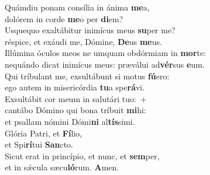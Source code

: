 \evenverse Quámdiu ponam consília in ánima \textbf{me}a,~\*\\
\evenverse dolórem in corde \textbf{me}o per \textbf{di}em?\\
\oddverse Usquequo exaltábitur inimícus meus \textbf{su}per me?~\*\\
\oddverse réspice, et exáudi me, Dómine, \textbf{De}us \textbf{me}us.\\
\evenverse Illúmina óculos meos ne umquam obdórmiam in \textbf{mor}te:~\*\\
\evenverse nequándo dicat inimícus meus: præválui ad\textbf{vér}sus \textbf{e}um.\\
\oddverse Qui tríbulant me, exsultábunt si motus \textbf{fú}ero:~\*\\
\oddverse ego autem in misericórdia \textbf{tu}a spe\textbf{rá}vi.\\
\evenverse Exsultábit cor meum in salutári tuo:~+\\
\evenverse  cantábo Dómino qui bona tríbuit \textbf{mi}hi:~\*\\
\evenverse et psallam nómini Dómi\textbf{ni} al\textbf{tís}simi.\\
\oddverse Glória Patri, et \textbf{Fí}lio,~\*\\
\oddverse et Spi\textbf{rí}tui \textbf{San}cto.\\
\evenverse Sicut erat in princípio, et nunc, et \textbf{sem}per,~\*\\
\evenverse et in sǽcula sæcu\textbf{ló}rum. \textbf{A}men.\\
